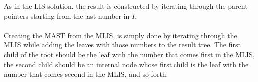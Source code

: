 
\noindent As in the LIS solution, the result is constructed by iterating through the parent pointers starting from the last number in $I$.\\
\\
Creating the MAST from the MLIS, is simply done by iterating through the MLIS while adding the leaves with those numbers to the result tree. The first child of the root should be the leaf with the number that comes first in the MLIS, the second child should be an internal node whose first child is the leaf with the number that comes second in the MLIS, and so forth.










